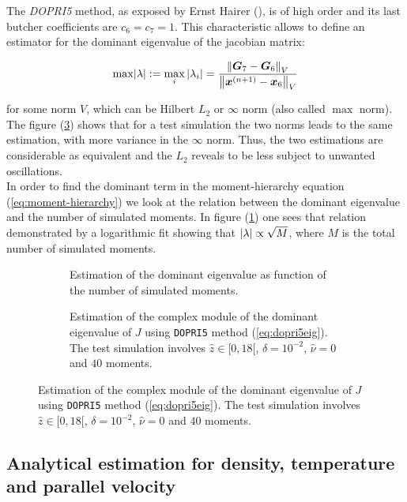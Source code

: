\documentclass[final]{jpp}
\DeclarePairedDelimiter\abs{\lvert}{\rvert}
\begin{document}
The \textit{DOPRI5} method, as exposed by Ernst Hairer (\cite{springer}), is of high order and its last butcher coefficients are $c_6 = c_7 = 1$. This characteristic allows to define an estimator for the dominant eigenvalue of the jacobian matrix:

\begin{equation} \label{eq:dopri5eig}
\max\abs*{\lambda} := \max_i{\abs*{\lambda_i}} = \frac{\norm{\vec{G}_7 - \vec{G}_6}_V}{\norm{\vec{x}^{(n+1)} - \vec{x}_6}_V}
\end{equation}

for some norm $V$, which can be Hilbert $L_2$ or $\infty$ norm (also called $\max$ norm). The figure (\ref{fig:dopri5eig}) shows that for a test simulation the two norms leads to the same estimation, with more variance in the $\infty$ norm.
Thus, the two estimations are considerable as equivalent and the $L_2$ reveals to be less subject to unwanted oscillations. 
\\
In order to find the dominant term in the moment-hierarchy equation (\ref{eq:moment-hierarchy}) we look at the relation between the dominant eigenvalue and the number of simulated moments. In figure (\ref{fig:dopri5p}) one sees that relation demonstrated by a logarithmic fit showing that $\abs*{\lambda} \propto \sqrt{M}$, where $M$ is the total number of simulated moments.

\begin{figure}
\begin{subfigure}{0.48\textwidth}
\resizebox{\textwidth}{!}{
    
}
\caption{Estimation of the dominant eigenvalue as function of the number of simulated moments.}
\label{fig:dopri5p}
\end{subfigure}
\hspace{0.04\textwidth}
\begin{subfigure}{0.48\textwidth}
\resizebox{\textwidth}{!}{
    
}
\caption{Estimation of the complex module of the dominant eigenvalue of $J$ using \texttt{DOPRI5} method (\ref{eq:dopri5eig}). The test simulation involves $\hat{z} \in [0, 18[$, $\delta = 10^{-2}$, $\hat{\nu} = 0$ and $40$ moments.}
\label{fig:dopri5eig}
\end{subfigure}
\end{figure}

\subsection{Analytical estimation for density, temperature and parallel velocity}
\end{document}
